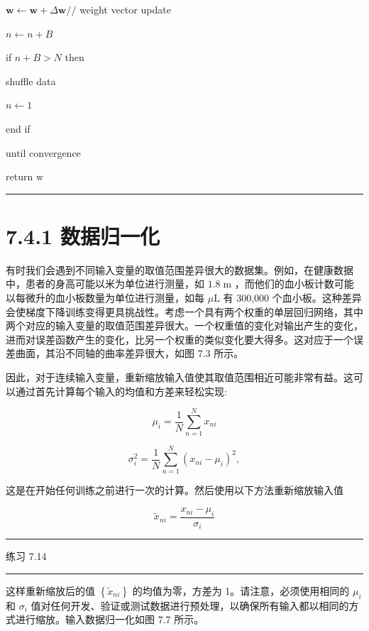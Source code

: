 \documentclass[10pt]{article}
\newcommand{\HRule}{\begin{center}\rule{0.9\linewidth}{0.2mm}\end{center}}
\begin{document}
\hspace*{1em} \(\mathbf{w} \leftarrow  \mathbf{w} + \Delta \mathbf{w}//\) weight vector update

\hspace*{1em} \(n \leftarrow  n + B\)

\hspace*{1em} if \(n + B > N\) then

\hspace*{2em} shuffle data

\hspace*{2em} \(n \leftarrow  1\)

\hspace*{1em} end if

until convergence

return \(\mathrm{w}\)

\HRule

\section*{7.4.1 数据归一化}

有时我们会遇到不同输入变量的取值范围差异很大的数据集。例如，在健康数据中，患者的身高可能以米为单位进行测量，如 \({1.8}\mathrm{\;m}\) ，而他们的血小板计数可能以每微升的血小板数量为单位进行测量，如每 \(\mu \mathrm{L}\) 有 300,000 个血小板。这种差异会使梯度下降训练变得更具挑战性。考虑一个具有两个权重的单层回归网络，其中两个对应的输入变量的取值范围差异很大。一个权重值的变化对输出产生的变化，进而对误差函数产生的变化，比另一个权重的类似变化要大得多。这对应于一个误差曲面，其沿不同轴的曲率差异很大，如图 7.3 所示。

因此，对于连续输入变量，重新缩放输入值使其取值范围相近可能非常有益。这可以通过首先计算每个输入的均值和方差来轻松实现:

\[
{\mu }_{i} = \frac{1}{N}\mathop{\sum }\limits_{{n = 1}}^{N}{x}_{ni} \tag{7.48}
\]

\[
{\sigma }_{i}^{2} = \frac{1}{N}\mathop{\sum }\limits_{{n = 1}}^{N}{\left( {x}_{ni} - {\mu }_{i}\right) }^{2}, \tag{7.49}
\]

这是在开始任何训练之前进行一次的计算。然后使用以下方法重新缩放输入值

\[
{\widetilde{x}}_{ni} = \frac{{x}_{ni} - {\mu }_{i}}{{\sigma }_{i}} \tag{7.50}
\]

\HRule

练习 7.14

\HRule

这样重新缩放后的值 \(\left\{  {\widetilde{x}}_{ni}\right\}\) 的均值为零，方差为 1。请注意，必须使用相同的 \({\mu }_{i}\) 和 \({\sigma }_{i}\) 值对任何开发、验证或测试数据进行预处理，以确保所有输入都以相同的方式进行缩放。输入数据归一化如图 7.7 所示。
\end{document}
